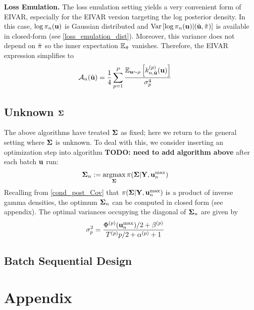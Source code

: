 \documentclass[12pt]{article}
\begin{document}
\bigskip
\noindent
\textbf{Loss Emulation.} The loss emulation setting yields a very convenient form of EIVAR, especially for the EIVAR version targeting the log posterior density. In this case,
$\log \pi_{n}(\mathbf{u})$ is Gaussian distributed and $\mathrm{Var}\left[\log \pi_{n}(\mathbf{u}) | (\tilde{\mathbf{u}}, \tilde{\pi}) \right]$ is 
available in closed-form (see \ref{loss_emulation_dist}). Moreover, this variance does not depend on $\tilde{\pi}$ so the inner expectation $\mathbb{E}_{\tilde{\pi}}$ vanishes. 
Therefore, the EIVAR expression simplifies to
\begin{align}
\mathcal{A}_{n}(\tilde{\mathbf{u}}) &= \frac{1}{4} \sum_{p = 1}^{P} \frac{\mathbb{E}_{\mathbf{u} \sim \rho}\left[k_{n, \tilde{\mathbf{u}}}^{(p)}(\mathbf{u})\right]}{\sigma_{p}^4} \label{EIVAR_llik_loss_emulation}
\end{align}

\subsection{Unknown $\boldsymbol{\Sigma}$}
The above algorithms have treated $\boldsymbol{\Sigma}$ as fixed; here we return to the general setting where $\boldsymbol{\Sigma}$ is unknown. To deal with this, we consider inserting an 
optimization step into algorithm \textbf{TODO: need to add algorithm above} after each batch $\mathbf{u}$ run:
\begin{align}
\boldsymbol{\Sigma}_{n} &:= \operatorname*{argmax}_{\boldsymbol{\Sigma}} \pi(\boldsymbol{\Sigma}|\mathbf{Y}, \mathbf{u}_{n}^{\text{max}}) \label{Cov_optimization}
\end{align}
Recalling from \ref{cond_post_Cov} that $\pi(\boldsymbol{\Sigma}|\mathbf{Y}, \mathbf{u}_{n}^{\text{max}})$ is a product of inverse gamma densities, the optimum $\boldsymbol{\Sigma}_{n}$ can 
be computed in closed form (see appendix). The optimal variances occupying the diagonal of $\boldsymbol{\Sigma}_{n}$ are given by 
\begin{align}
\sigma_{p}^2 &= \frac{{\Phi}^{(p)}(\mathbf{u}_{n}^{\text{max}})/2 + {\beta}^{(p)}}{{T}^{(p)}{p}/2 + {\alpha}^{(p)} + 1}
\end{align}

\subsection{Batch Sequential Design}


\section{Appendix}
\end{document}
